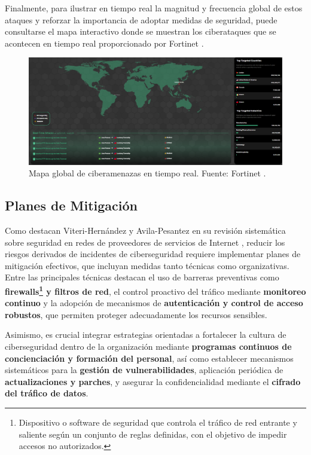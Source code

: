 \documentclass[a4paper, 11pt]{article}
\begin{document}
Finalmente, para ilustrar en tiempo real la magnitud y frecuencia global de estos ataques y reforzar la importancia de adoptar medidas de seguridad, puede consultarse el mapa 
interactivo donde se muestran los ciberataques que se acontecen en tiempo real proporcionado por Fortinet \cite{fortinet}. 

\begin{figure}[H]
    \centering
    \includegraphics[width=\textwidth]{images/mapa.png}
    \caption{Mapa global de ciberamenazas en tiempo real. Fuente: Fortinet \cite{fortinet}.}
    \label{fig:mapa-fortiguard}
\end{figure}


\subsection{Planes de Mitigación}

Como destacan Viteri-Hernández y Avila-Pesantez en su revisión sistemática sobre seguridad en redes de proveedores de servicios de Internet \cite{mitigacion}, reducir los riesgos derivados de incidentes de ciberseguridad requiere implementar planes de mitigación efectivos, que incluyan medidas tanto técnicas como organizativas. Entre las principales técnicas destacan el uso de barreras preventivas como \textbf{firewalls\footnote{Dispositivo o software de seguridad que controla el tráfico de red entrante y saliente según un conjunto de reglas definidas, con el objetivo de impedir accesos no autorizados.} y filtros de red}, el control proactivo del tráfico mediante \textbf{monitoreo continuo} y la adopción de mecanismos de \textbf{autenticación y control de acceso robustos}, que permiten proteger adecuadamente los recursos sensibles.

Asimismo, es crucial integrar estrategias orientadas a fortalecer la cultura de ciberseguridad dentro de la organización mediante \textbf{programas continuos de concienciación y formación del personal}, así como establecer mecanismos sistemáticos para la \textbf{gestión de vulnerabilidades}, aplicación periódica de \textbf{actualizaciones y parches}, y asegurar la confidencialidad mediante el \textbf{cifrado del tráfico de datos}.
\end{document}
